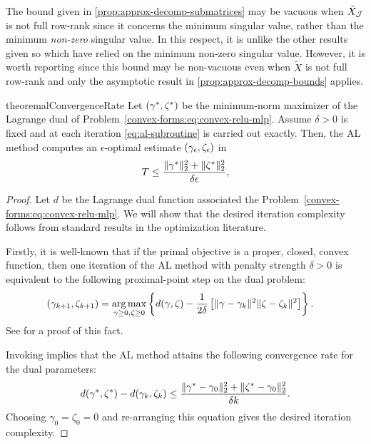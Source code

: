 \begin{remark}
	The bound given in \cref{prop:approx-decomp-submatrices} may be
	vacuous when \( \tilde X_{\mathcal{J}} \) is not full row-rank since it
	concerns the minimum singular value, rather than the minimum \emph{non-zero}
	singular value.
	In this respect, it is unlike the other results given so which have relied
	on the minimum non-zero singular value.
	However, it is worth reporting since this bound may be non-vacuous even when
	\( \tilde X \) is not full row-rank and only the asymptotic result in
	\cref{prop:approx-decomp-bounds} applies.
\end{remark}

\begin{restatable}{theorem}{alConvergenceRate}\label{thm:al-convergence-rate}
	Let \( \left(\gamma^*, \zeta^*\right) \) be the minimum-norm maximizer of the Lagrange dual of Problem~\ref{convex-forms:eq:convex-relu-mlp}.
	Assume \( \delta > 0 \) is fixed and at each iteration \cref{eq:al-subroutine} is carried out exactly.
	Then, the AL method computes an \( \epsilon \)-optimal estimate \( \left(\gamma_\epsilon, \zeta_\epsilon\right) \) in
	\begin{equation*}
		T \leq \frac{\|\gamma^*\|_2^2 + \|\zeta^*\|_2^2}{\delta \epsilon},
	\end{equation*}
\end{restatable}
\begin{proof}
	Let \( d \) be the Lagrange dual function associated the Problem~\ref{convex-forms:eq:convex-relu-mlp}.
	We will show that the desired iteration complexity follows from standard results in the optimization literature.

	Firstly, it is well-known that if the primal objective is a proper, closed, convex function, then one iteration of the AL method with penalty strength \( \delta > 0 \) is equivalent to the following proximal-point step on the dual problem:
	\begin{align*}
		\left(\gamma_{k+1}, \zeta_{k+1}\right) & = \mathop{\rm arg\,max}_{\gamma \geq 0, \zeta \geq 0} \left\{d(\gamma, \zeta) - \frac{1}{2 \delta} \left[\|\gamma - \gamma_k\|^2 \|\zeta - \zeta_k\|^2\right] \right\}.
	\end{align*}
	See \citet[Section 5.4.6]{bertsekas1997nonlinear} for a proof of this fact.

	Invoking \citet[Theorem 2.1]{guler1991convergence} implies that the AL method attains the following convergence rate for the dual parameters:
	\begin{equation}
		d(\gamma^*, \zeta^*) - d(\gamma_k, \zeta_k) \leq \frac{\|\gamma^* - \gamma_0\|_2^2 + \|\zeta^* - \gamma_0\|_2^2}{\delta k}.
	\end{equation}
	Choosing \( \gamma_0 = \zeta_0 = 0 \) and re-arranging this equation gives the desired iteration complexity.
\end{proof}

